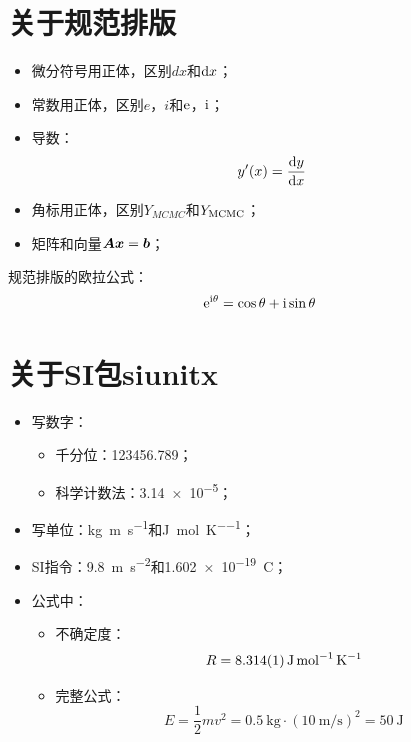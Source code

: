 
\section{关于规范排版}

\begin{itemize}
	\item 微分符号用正体，区别$dx$和$\mathrm{d} x$；
	\item 常数用正体，区别$e$，$i$和$\mathrm{e}$，$\mathrm{i}$；
	\item 导数：
	$$
	y'(x) = \dfrac{\mathrm{d}y}{\mathrm{d}x}
	$$
	\item 角标用正体，区别$Y_{MCMC}$和$Y_{\mathrm{MCMC}}$；
	\item 矩阵和向量$\boldsymbol{Ax}=\boldsymbol{b}$；
\end{itemize}

\begin{ubox}{规范排版的欧拉公式：}
	\begin{equation}
		\mathrm{e}^{\mathrm{i}\theta} = \cos\theta + \mathrm{i}\sin\theta
	\end{equation}
\end{ubox}

\section{关于SI包siunitx}
\begin{itemize}
	\item 写数字：
	\begin{itemize}
		\item 千分位：\num{123456.789}；
		\item 科学计数法：\num{3.14e-5}；
	\end{itemize}
	
	\item 写单位：\si{\kilogram\metre\per\second}和\si{\joule\per\mole\per\kelvin}；
	
	\item SI指令：\SI{9.8}{\metre\per\second\squared}和\SI{1.602e-19}{\coulomb}；
	
	\item 公式中：
	\begin{itemize}
		\item 不确定度：
		\[
		R = \SI{8.314 \pm 0.001}{\joule\per\mole\per\kelvin}
		\]
		\item 完整公式：
		\[
		E = \frac{1}{2} m v^2 = \SI{0.5}{\kilogram} \cdot \left( \SI{10}{\metre\per\second} \right)^2 = \SI{50}{\joule}
		\]
	\end{itemize}
\end{itemize}

